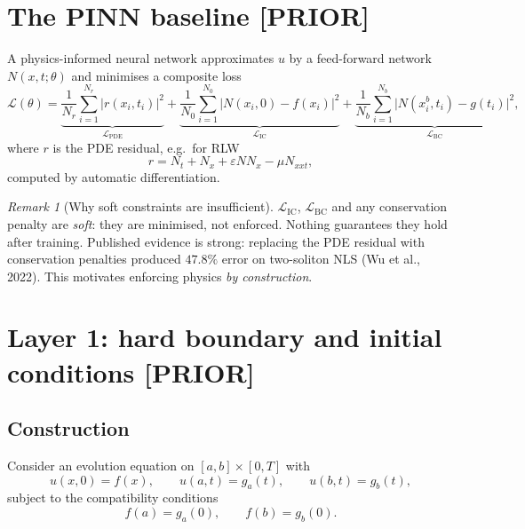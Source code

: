 \documentclass[11pt,a4paper]{article}
\theoremstyle{remark}
\newtheorem{remark}{Remark}
\begin{document}
\section{The PINN baseline \textbf{[PRIOR]}}

A physics-informed neural network approximates $u$ by a feed-forward network
$N(x,t;\theta)$ and minimises a composite loss
\begin{equation}
\mathcal{L}(\theta)
= \underbrace{\frac{1}{N_r}\sum_{i=1}^{N_r} \big|r(x_i,t_i)\big|^2}_{\mathcal{L}_{\text{PDE}}}
+ \underbrace{\frac{1}{N_0}\sum_{i=1}^{N_0}\big|N(x_i,0)-f(x_i)\big|^2}_{\mathcal{L}_{\text{IC}}}
+ \underbrace{\frac{1}{N_b}\sum_{i=1}^{N_b}\big|N(x_i^b,t_i)-g(t_i)\big|^2}_{\mathcal{L}_{\text{BC}}},
\end{equation}
where $r$ is the PDE residual, e.g.\ for RLW
\begin{equation}
r = N_t + N_x + \varepsilon N N_x - \mu N_{xxt},
\end{equation}
computed by automatic differentiation.

\begin{remark}[Why soft constraints are insufficient]
$\mathcal{L}_{\text{IC}}$, $\mathcal{L}_{\text{BC}}$ and any conservation
penalty are \emph{soft}: they are minimised, not enforced. Nothing guarantees
they hold after training. Published evidence is strong: replacing the PDE
residual with conservation penalties produced $47.8\%$ error on two-soliton NLS
(Wu et al., 2022). This motivates enforcing physics \emph{by construction}.
\end{remark}

\section{Layer 1: hard boundary and initial conditions \textbf{[PRIOR]}}

\subsection{Construction}

Consider an evolution equation on $[a,b]\times[0,T]$ with
\begin{equation}
u(x,0) = f(x), \qquad u(a,t) = g_a(t), \qquad u(b,t) = g_b(t),
\end{equation}
subject to the compatibility conditions
\begin{equation}
f(a) = g_a(0), \qquad f(b) = g_b(0).
\label{eq:compat}
\end{equation}
\end{document}
